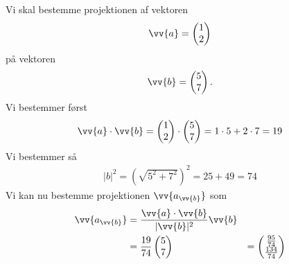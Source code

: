 \begin{exa}
Vi skal bestemme projektionen af vektoren 
\begin{align*}
\vv{a} = \begin{pmatrix}
1 \\ 2
\end{pmatrix}
\end{align*}
på vektoren 
\begin{align*}
\vv{b} = \begin{pmatrix}
5 \\ 7
\end{pmatrix}.
\end{align*}
Vi bestemmer først
\begin{align*}
\vv{a} \cdot \vv{b} = \begin{pmatrix}
1 \\ 2
\end{pmatrix}
\cdot \begin{pmatrix}
5 \\ 7
\end{pmatrix}
= 1\cdot 5 + 2\cdot 7 = 19
\end{align*}
Vi bestemmer så
\begin{align*}
|b|^2 = (\sqrt{5^2+7^2})^2 =25+49 = 74
\end{align*}
Vi kan nu bestemme projektionen $\vv{a_{\vv{b}}}$ som
\begin{align*}
\vv{a_{\vv{b}}} &= \frac{\vv{a}\cdot \vv{b}}{|\vv{b}|^2}\vv{b} \\&= \frac{19}{74}\begin{pmatrix}
5 \\ 7
\end{pmatrix} &= \begin{pmatrix}
\frac{95}{74} \\ \frac{134}{74}
\end{pmatrix}
\end{align*}



\end{exa}
